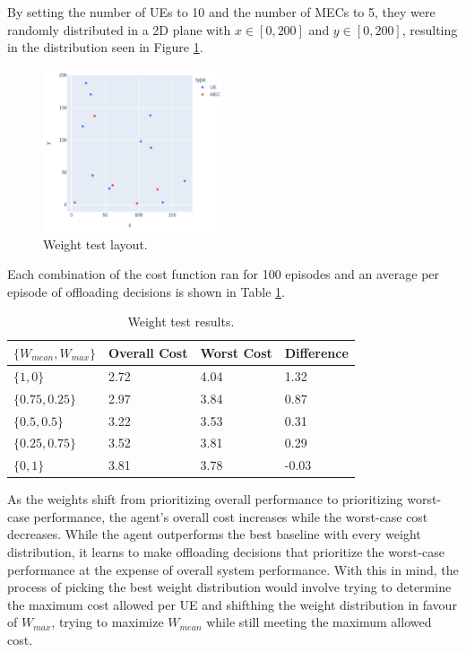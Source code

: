 \documentclass[conference]{IEEEtran}
\begin{document}
By setting the number of \acrshort{UE}s to 10 and the number of \acrshort{MEC}s to 5, they were randomly distributed in a 2D plane with $x \in [0, 200]$ and $y \in [0, 200]$, resulting in the distribution seen in Figure \ref{weight_test}.

\begin{figure}[H]
  \centering
  \includegraphics[width=200px]{images/5_10_layout.png}
  \caption{Weight test layout.}  \label{weight_test}
\end{figure}

Each combination of the cost function ran for 100 episodes and an average per episode of offloading decisions is shown in Table \ref{weight_table}.

\begin{table}[H]
\centering
\begin{tabular}{|l|l|l|l|}
\hline
$\{W_{mean}, W_{max}\}$ & Overall Cost & Worst Cost & Difference \\ \hline
$\{1, 0\}$       & 2.72 & 4.04 & 1.32\\
$\{0.75, 0.25\}$  & 2.97 & 3.84  & 0.87\\
$\{0.5, 0.5\}$ & 3.22 & 3.53 & 0.31\\ 
$\{0.25, 0.75\}$ & 3.52 & 3.81 & 0.29\\ 
$\{0, 1\}$ & 3.81 & 3.78 & -0.03 \\ \hline
\end{tabular}
\caption{Weight test results.} \label{weight_table}
\end{table}

As the weights shift from prioritizing overall performance to prioritizing worst-case performance, the agent's overall cost increases while the worst-case cost decreases. While the agent outperforms the best baseline with every weight distribution, it learns to make offloading decisions that prioritize the worst-case performance at the expense of overall system performance. With this in mind, the process of picking the best weight distribution would involve trying to determine the maximum cost allowed per \acrshort{UE} and shifthing the weight distribution in favour of $W_{max}$, trying to maximize $W_{mean}$ while still meeting the maximum allowed cost.
\end{document}

